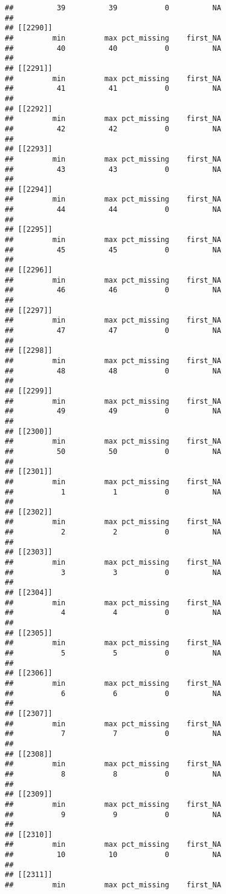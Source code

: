 \documentclass[
]{article}
\begin{document}
\begin{verbatim}
##          39          39           0          NA 
## 
## [[2290]]
##         min         max pct_missing    first_NA 
##          40          40           0          NA 
## 
## [[2291]]
##         min         max pct_missing    first_NA 
##          41          41           0          NA 
## 
## [[2292]]
##         min         max pct_missing    first_NA 
##          42          42           0          NA 
## 
## [[2293]]
##         min         max pct_missing    first_NA 
##          43          43           0          NA 
## 
## [[2294]]
##         min         max pct_missing    first_NA 
##          44          44           0          NA 
## 
## [[2295]]
##         min         max pct_missing    first_NA 
##          45          45           0          NA 
## 
## [[2296]]
##         min         max pct_missing    first_NA 
##          46          46           0          NA 
## 
## [[2297]]
##         min         max pct_missing    first_NA 
##          47          47           0          NA 
## 
## [[2298]]
##         min         max pct_missing    first_NA 
##          48          48           0          NA 
## 
## [[2299]]
##         min         max pct_missing    first_NA 
##          49          49           0          NA 
## 
## [[2300]]
##         min         max pct_missing    first_NA 
##          50          50           0          NA 
## 
## [[2301]]
##         min         max pct_missing    first_NA 
##           1           1           0          NA 
## 
## [[2302]]
##         min         max pct_missing    first_NA 
##           2           2           0          NA 
## 
## [[2303]]
##         min         max pct_missing    first_NA 
##           3           3           0          NA 
## 
## [[2304]]
##         min         max pct_missing    first_NA 
##           4           4           0          NA 
## 
## [[2305]]
##         min         max pct_missing    first_NA 
##           5           5           0          NA 
## 
## [[2306]]
##         min         max pct_missing    first_NA 
##           6           6           0          NA 
## 
## [[2307]]
##         min         max pct_missing    first_NA 
##           7           7           0          NA 
## 
## [[2308]]
##         min         max pct_missing    first_NA 
##           8           8           0          NA 
## 
## [[2309]]
##         min         max pct_missing    first_NA 
##           9           9           0          NA 
## 
## [[2310]]
##         min         max pct_missing    first_NA 
##          10          10           0          NA 
## 
## [[2311]]
##         min         max pct_missing    first_NA 

\end{verbatim}
\end{document}

